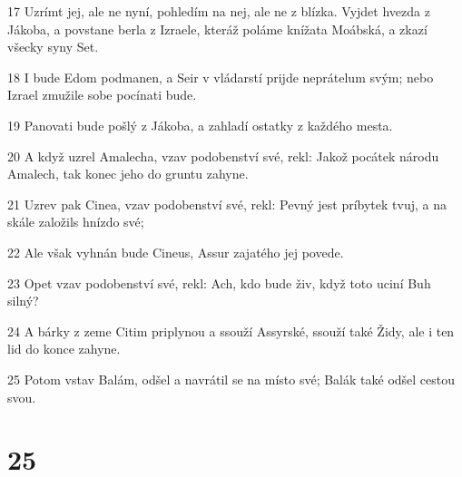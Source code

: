 \par 17 Uzrímt jej, ale ne nyní, pohledím na nej, ale ne z blízka. Vyjdet hvezda z Jákoba, a povstane berla z Izraele, kteráž poláme knížata Moábská, a zkazí všecky syny Set.
\par 18 I bude Edom podmanen, a Seir v vládarstí prijde neprátelum svým; nebo Izrael zmužile sobe pocínati bude.
\par 19 Panovati bude pošlý z Jákoba, a zahladí ostatky z každého mesta.
\par 20 A když uzrel Amalecha, vzav podobenství své, rekl: Jakož pocátek národu Amalech, tak konec jeho do gruntu zahyne.
\par 21 Uzrev pak Cinea, vzav podobenství své, rekl: Pevný jest príbytek tvuj, a na skále založils hnízdo své;
\par 22 Ale však vyhnán bude Cineus, Assur zajatého jej povede.
\par 23 Opet vzav podobenství své, rekl: Ach, kdo bude živ, když toto uciní Buh silný?
\par 24 A bárky z zeme Citim priplynou a ssouží Assyrské, ssouží také Židy, ale i ten lid do konce zahyne.
\par 25 Potom vstav Balám, odšel a navrátil se na místo své; Balák také odšel cestou svou.

\chapter{25}

